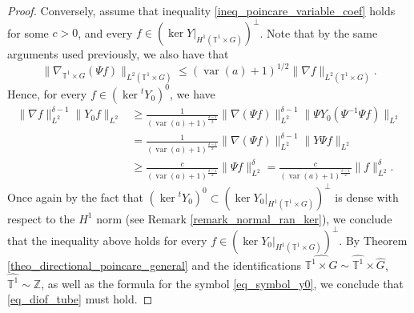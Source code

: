 \documentclass[11pt]{amsart}
\numberwithin{theorem}{section}
\numberwithin{equation}{section}
\theoremstyle{definition}
\numberwithin{example}{section}
\theoremstyle{definition}
\theoremstyle{definition}
\newcommand{\Z}{\mathbb{Z}}
\newcommand{\T}{\mathbb{T}}
\begin{document}
\begin{proof}
Conversely, assume that inequality \eqref{ineq_poincare_variable_coef} holds for some $c>0$, and every $f\in (\ker Y|_{H^1(\T^1\times G)})^\perp$. Note that by the same arguments used previously, we also have that
\begin{equation*}
    \|\nabla_{\T^1\times G}(\Psi f)\|_{L^2(\T^1\times G)}\leq (\operatorname{var}(a)+1)^{1/2}\|\nabla f\|_{L^2(\T^1\times G)}.
\end{equation*}
Hence, for every $f\in (\ker {}^tY_0)^0$, we have
\begin{align*}
    \|\nabla f\|_{L^2}^{\delta-1}\|Y_0f\|_{L^2}&\geq \frac{1}{(\operatorname{var}(a)+1)^{\frac{\delta-1}{2}}}\|\nabla (\Psi f)\|_{L^2}^{\delta-1}\|\Psi Y_0(\Psi^{-1} \Psi f)\|_{L^2}\\
    &=\frac{1}{(\operatorname{var}(a)+1)^{\frac{\delta-1}{2}}}\|\nabla (\Psi f)\|_{L^2}^{\delta-1}\|Y\Psi f\|_{L^2}\\
    &\geq  \frac{c}{(\operatorname{var}(a)+1)^{\frac{\delta-1}{2}}}\|\Psi f\|_{L^2}^\delta= \frac{c}{(\operatorname{var}(a)+1)^{\frac{\delta-1}{2}}}\|f\|_{L^2}^\delta.
\end{align*}
Once again by the fact that $ (\ker {}^tY_0)^0\subset (\ker Y_0|_{H^1(\T^1\times G)})^\perp$ is dense  with respect to the $H^1$ norm (see Remark \ref{remark_normal_ran_ker}), we conclude that the inequality above holds for every $f\in (\ker Y_0|_{H^1(\T^1\times G)})^\perp$.
 By Theorem \ref{theo_directional_poincare_general} and  the identifications $\widehat{\T^1\times G}\sim \widehat{\T^1}\times \widehat{G}$,  $\widehat{\T^1}\sim \Z$, as well as the formula for the symbol \eqref{eq_symbol_y0}, 
we conclude that \eqref{eq_diof_tube} must hold.
\end{proof}
\end{document}
